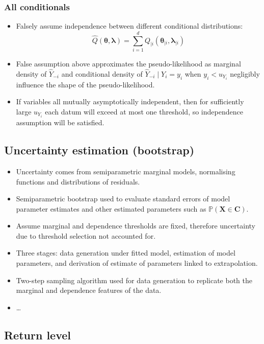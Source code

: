 \documentclass{article}
\numberwithin{equation}{section}
\begin{document}
\subsubsection{All conditionals}

\begin{itemize}
  \item Falsely assume independence between different conditional distributions: 
    \[
      \hat{Q}( \bm{\theta}, \bm{\lambda}) = \sum_{i=1}^{d}{Q_{\mid i}(\bm{\theta}_{\mid i}, \bm{\lambda}_{\mid i})}
    \]
  \item False assumption above approximates the pseudo-likelihood as marginal density of $\hat{Y}_{-i}$ and conditional density of $\hat{Y}_{-i} \mid Y_i = y_i$ when $y_i < u_{Y_i}$ negligibly influence the shape of the pseudo-likelihood. 
  \item If variables all mutually asymptotically independent, then for sufficiently large $u_{Y_i}$ each datum will exceed at most one threshold, so independence assumption will be satisfied. 
\end{itemize}

\subsection{Uncertainty estimation (bootstrap)}

\begin{itemize}
  \item Uncertainty comes from semiparametric marginal models, normalising functions and distributions of residuals. 
  \item Semiparametric bootstrap used to evaluate standard errors of model parameter estimates and other estimated parameters such as $\mathbb{P}(\bm{X} \in \bm{C})$. 
  \item Assume marginal and dependence thresholds are fixed, therefore uncertainty due to threshold selection not accounted for. 
  \item Three stages: data generation under fitted model, estimation of model parameters, and derivation of estimate of parameters linked to extrapolation. 
  \item Two-step sampling algorithm used for data generation to replicate both the marginal and dependence features of the data. 
  \item \ldots
\end{itemize}


\subsection{Return level}
\end{document}
